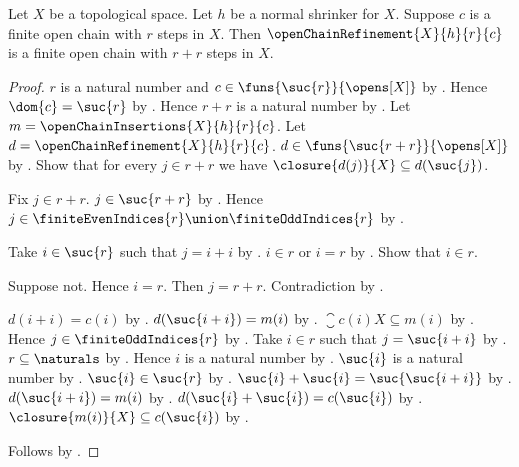 \begin{theorem}\label{open_chain_refinement_is_finite_open_chain}
    Let $X$ be a topological space.
    Let $h$ be a normal shrinker for $X$.
    Suppose $c$ is a finite open chain with $r$ steps in $X$.
    Then $\openChainRefinement{X}{h}{r}{c}$ is a finite open chain with
        $r+r$ steps in $X$.
\end{theorem}
\begin{proof}
    $r$ is a natural number and
        $c\in\funs{\suc{r}}{\opens[X]}$
        by .
    Hence $\dom{c}=\suc{r}$ by .
    Hence $r+r$ is a natural number by .
    Let $m=\openChainInsertions{X}{h}{r}{c}$.
    Let $d=\openChainRefinement{X}{h}{r}{c}$.
    $d\in\funs{\suc{r+r}}{\opens[X]}$
        by .
    Show that for every $j\in r+r$ we have
        $\closure{d(j)}{X}\subseteq d(\suc{j})$.
    \begin{subproof}
        Fix $j\in r+r$.
        $j\in\suc{r+r}$ by .
        Hence $j\in\finiteEvenIndices{r}\union\finiteOddIndices{r}$
            by .
        \begin{byCase}
            Take $i\in\suc{r}$ such that $j=i+i$
                by .
            $i\in r$ or $i=r$ by .
            Show that $i\in r$.
            \begin{subproof}
                Suppose not.
                Hence $i=r$.
                Then $j=r+r$.
                Contradiction by .
            \end{subproof}
            $d(i+i)=c(i)$ by .
            $d(\suc{i+i})=m(i)$
                by .
            $\closure{c(i)}{X}\subseteq m(i)$
                by .
            Hence $j\in\finiteOddIndices{r}$ by .
            Take $i\in r$ such that $j=\suc{i+i}$
                by .
            $r\subseteq\naturals$
                by .
            Hence $i$ is a natural number by .
            $\suc{i}$ is a natural number by .
            $\suc{i}\in\suc{r}$
                by .
            $\suc{i}+\suc{i}=\suc{\suc{i+i}}$
                by .
            $d(\suc{i+i})=m(i)$
                by .
            $d(\suc{i}+\suc{i})=c(\suc{i})$
                by .
            $\closure{m(i)}{X}\subseteq c(\suc{i})$
                by .
        \end{byCase}
    \end{subproof}
    Follows by .
\end{proof}

